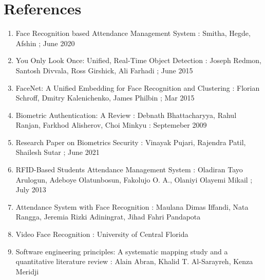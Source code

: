 \documentclass[conference]{IEEEtran}
\begin{document}
\section{References}
\begin{enumerate}
    \item Face Recognition based Attendance Management System : Smitha, Hegde, Afshin ; June 2020
    \item You Only Look Once: Unified, Real-Time Object Detection : Joseph Redmon, Santosh Divvala, Ross Girshick, Ali Farhadi ; June 2015
    \item FaceNet: A Unified Embedding for Face Recognition and Clustering : Florian Schroff, Dmitry Kalenichenko, James Philbin ; Mar 2015
    \item Biometric Authentication: A Review : Debnath Bhattacharyya, Rahul Ranjan, Farkhod Alisherov, Choi Minkyu : Septemeber 2009
    \item Research Paper on Biometrics Security : Vinayak Pujari, Rajendra Patil, Shailesh Sutar ; June 2021
    \item RFID-Based Students Attendance Management System : Oladiran Tayo Arulogun, Adeboye Olatunbosun, Fakolujo O. A., Olaniyi Olayemi Mikail ; July 2013
    \item Attendance System with Face Recognition : Maulana Dimas Iffandi, Nata Rangga, Jeremia Rizki Adiningrat, Jihad Fahri Pandapota
    \item Video Face Recognition : University of Central Florida 
    \item Software engineering principles: A systematic mapping study and a quantitative literature review : Alain Abran, Khalid T. Al-Sarayreh, Kenza Meridji




\end{enumerate}
\end{document}
